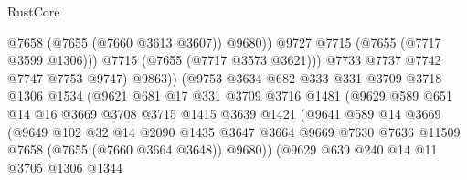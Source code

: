 \begin{lexlean}{RustCore}
\begin{coremodule}
                                      @7658
                                      (@7655 (@7660 @3613 @3607))
                                      @9680))
                                  @9727
                                  @7715
                                  (@7655 (@7717 @3599 @1306)))
                                @7715
                                (@7655 (@7717 @3573 @3621)))
                              @7733
                              @7737
                              @7742
                              @7747
                              @7753
                              @9747)
                            @9863))
                        (@9753
                          @3634
                          @682
                          @333
                          @331
                          @3709
                          @3718
                          @1306
                          @1534
                          (@9621
                            @681
                            @17
                            @331
                            @3709
                            @3716
                            @1481
                            (@9629
                              @589
                              @651
                              @14
                              @16
                              @3669
                              @3708
                              @3715
                              @1415
                              @3639
                              @1421
                              (@9641
                                @589
                                @14
                                @3669
                                (@9649
                                  @102
                                  @32
                                  @14
                                  @2090
                                  @1435
                                  @3647
                                  @3664
                                  @9669
                                  @7630
                                  @7636
                                  @11509
                                  @7658
                                  (@7655 (@7660 @3664 @3648))
                                  @9680))
                              (@9629
                                @639
                                @240
                                @14
                                @11
                                @3705
                                @1306
                                @1344

\end{coremodule}
\end{lexlean}
